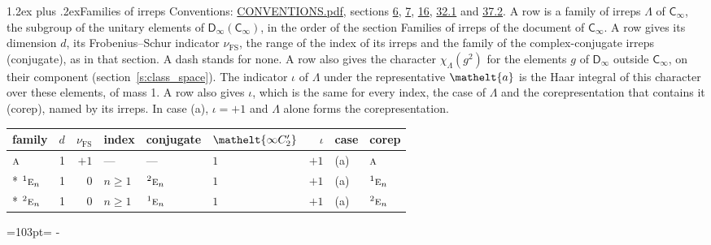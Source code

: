 \documentclass[10pt,a4paper]{article}
\makeatletter
\renewcommand\section{\@startsection{section}{1}{\z@}{-3ex plus -1ex minus -.2ex}%
  {1.2ex plus .2ex}{\normalfont\large\sffamily\bfseries\color{parttitle}}}
\newcommand{\needspace}[1]{\par\penalty-100\begingroup\dimen0=#1\relax\dimen2=\pagegoal
  \advance\dimen2-\pagetotal\ifdim\dimen0>\dimen2\relax\ifdim\dimen2>0pt\vfil\break\fi\fi
  \endgroup}
\numberwithin{equation}{section}
\newcommand{\eltfont}[1]{{\let\sigma\eltsigma\mathelt{#1}}}
\newcommand{\grp}[1]{\mathsf{#1}}
\newcommand{\irr}[1]{\text{\normalfont\scshape #1}}
\newcommand{\conjpair}[1]{{}^{#1}}
\newcommand{\comp}[1]{\eltfont{#1}}
\newcommand{\elt}[1]{\eltfont{#1}}
\newcommand{\irchar}[1]{\chi_{#1}}
\newcommand{\fsind}{\nu_{\mathrm{FS}}}
\makeatother
\begin{document}
\section{Families of irreps}\label{s:families}
Conventions: \href{../../CONVENTIONS.pdf}{CONVENTIONS.pdf}, sections \href{../../../rotation/CONVENTIONS.pdf\#conv.6}{6}, \href{../../../rotation/CONVENTIONS.pdf\#conv.7}{7}, \href{../../../rotation/CONVENTIONS.pdf\#conv.16}{16}, \href{../../CONVENTIONS.pdf\#conv.32.1}{32.1} and \href{../../CONVENTIONS.pdf\#conv.37.2}{37.2}.
\leavevmode\label{n:irrep.Delta}\label{n:head.family.irreps}A row is a family of irreps $\Lambda$ of $\grp{C_{\infty}}$, the subgroup of the unitary elements of $\grp{D_{\infty}}(\grp{C_{\infty}})$, in the order of the section Families of irreps of the document of \href{../../../rotation/data/pdf/Cinf.pdf}{$\grp{C_{\infty}}$}. \label{n:index.dimension}\label{n:index.frobenius}\label{n:head.index.family}\label{n:index.family}\label{n:head.conjugate}A row gives its dimension $d$, its Frobenius--Schur indicator $\fsind$, the range of the index of its irreps and the family of the complex-conjugate irreps (conjugate), as in that section. A dash stands for none. \label{n:function.character}A row also gives the character $\irchar{\Lambda}(g^2)$ for the elements $g$ of $\grp{D_{\infty}}$ outside $\grp{C_{\infty}}$, on their component (section~\ref{s:class_space}). The indicator $\iota$ of $\Lambda$ under the representative $\elt{a}$ is the Haar integral of this character over these elements, of mass 1. \label{n:head.case.corep}\label{n:head.corep}A row also gives $\iota$, which is the same for every index, the case of $\Lambda$ and the corepresentation that contains it (corep), named by its irreps. In case (a), $\iota = +1$ and $\Lambda$ alone forms the corepresentation.
{\small\renewcommand{\arraystretch}{1.25}\begin{longtable}{@{}lrrlllrll@{}}\toprule
family & $d$ & $\fsind$ & index & conjugate & $\comp{\infty C_2'}$ & $\iota$ & case & corep\\\midrule\endhead
\bottomrule\endfoot\endlastfoot
$\irr{a}$ & 1 & $+1$ & --- & --- & $1$ & $+1$ & (a) & $\irr{a}$\\*
$\conjpair{1}\irr{e}_{n}$ & 1 & $0$ & $n \ge 1$ & $\conjpair{2}\irr{e}_{n}$ & $1$ & $+1$ & (a) & $\conjpair{1}\irr{e}_{n}$\\*
$\conjpair{2}\irr{e}_{n}$ & 1 & $0$ & $n \ge 1$ & $\conjpair{1}\irr{e}_{n}$ & $1$ & $+1$ & (a) & $\conjpair{2}\irr{e}_{n}$\\
\bottomrule\end{longtable}}
\needspace{103pt}
\end{document}

